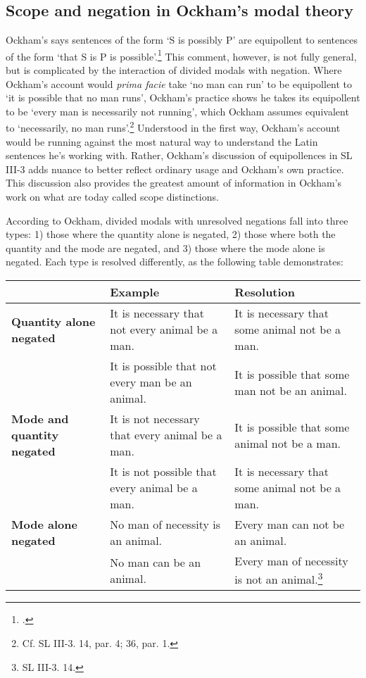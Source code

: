 \documentclass[a4paper]{article}
\begin{document}
\subsection{Scope and negation in Ockham's modal theory}
Ockham's says sentences of the form `S is possibly P' are equipollent to sentences of the form `that S is P is possible'.\footnote{\cite[II. 9, p. 246; 10, p. 248]{OckhamSL2}.} This comment, however, is not fully general, but is complicated by the interaction of divided modals with negation. Where Ockham's account would \textit{prima facie} take `no man can run' to be equipollent to `it is possible that no man runs', Ockham's practice shows he takes its equipollent to be `every man is necessarily not running', which Ockham assumes equivalent to `necessarily, no man runs'.\footnote{Cf. SL III-3. 14, par. 4; 36, par. 1.} Understood in the first way, Ockham's account would be running against the most natural way to understand the Latin sentences he's working with. Rather, Ockham's discussion of equipollences in SL III-3 adds nuance to better reflect ordinary usage and Ockham's own practice. This discussion also provides the greatest amount of information in Ockham's work on what are today called scope distinctions.

According to Ockham, divided modals with unresolved negations fall into three types: 1) those where the quantity alone is negated, 2) those where both the quantity and the mode are negated, and 3) those where the mode alone is negated. Each type is resolved differently, as the following table demonstrates:
\begin{center}
\begin{tabular}{|p{3cm}|p{4cm}|p{4cm}|}
\hline & \textbf{Example} & \textbf{Resolution}  \\
\hline \textbf{Quantity alone negated}  & It is necessary that not every animal be a man. & It is necessary that some animal not be a man. \\
& It is possible that not every man be an animal. & It is possible that some man not be an animal. \\ \hline 
\textbf{Mode and quantity negated} & It is not necessary that every animal be a man. & It is possible that some animal not be a man. \\
& It is not possible that every animal be a man. & It is necessary that some animal not be a man. \\ \hline 
\textbf{Mode alone negated} & No man of necessity is an animal. & Every man can not be an animal. \\
& No man can be an animal. & Every man of necessity is not an animal.\footnote{SL III-3. 14.} \\ \hline
\end{tabular}
\end{center}
\bigskip
\end{document}
